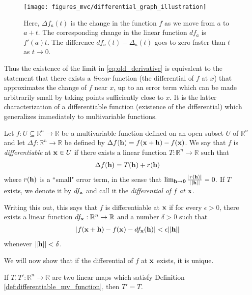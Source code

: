 \documentclass[12pt,letterpaper,reqno]{article}
\numberwithin{equation}{section}
\newcommand{\bh}{{\bf h}}
\newcommand{\R}{\ensuremath{\mathbb R}}
\newcommand{\zv}{{\bf 0}}
\newcommand{\bx}{{\bf x}}
\begin{document}
{\begin{figure}[h]
	\centering
	\texttt{[image: figures\_mvc/differential\_graph\_illustration]}
	\caption{Here, $\Delta f_a(t)$ is the change in the function $f$ as we move from $a$ to $a+t$. The corresponding change in the linear function $df_a$ is $f'(a)t$. The difference $df_a(t)-\Delta_a(t)$ goes to zero faster than $t$ as $t \to 0$.}
\end{figure}

Thus the existence of the limit in \eqref{eq:old_derivative} is equivalent to the statement that there exists a \emph{linear} function (the differential of $f$ at $x$) that approximates the change of $f$ near $x$, up to an error term which can be made arbitrarily small by taking points sufficiently close to $x$. It is the latter characterization of a differentiable function (existence of the differential) which generalizes immediately to multivariable functions.

\begin{defn}\label{def:differentiable_mv_function}
Let $f:U \subseteq \R^n \to \R$ be a multivariable function defined on an open subset $U$ of $\R^n$ and let $\Delta f:\R^n \to \R$ be defined by $\Delta f(\bh)=f(\bx + \bh)-f(\bx)$. We say that $f$ is \emph{differentiable} at $\bx \in U$ if there exists a linear function $T:\R^n \to \R$ such that  
\begin{align*}
	\Delta f(\bh)=T(\bh)+r(\bh)
\end{align*}	
where $r(\bh)$ is a ``small" error term, in the sense that $\lim_{\bh \to \zv}\frac{|r(\bh)|}{||\bh||}=0$. If $T$ exists, we denote it by $df_\bx$ and call it the \emph{differential of $f$ at $\bx$}. 

Writing this out, this says that $f$ is differentiable at $\bx$ if for every $\epsilon>0$, there exists a linear function $df_\bx:\R^n \to \R$ and a number $\delta>0$ such that 
\begin{align*}
	|f(\bx+\bh)-f(\bx)-df_\bx(\bh)|<\epsilon ||\bh||
\end{align*}
whenever $||\bh||<\delta$.
\end{defn}
We will now show that if the differential of $f$ at $\bx$ exists, it is unique.

\begin{prop}\label{prop:uniqueness_of_the_differential}
	If $T,T':\R^n \to \R$ are two linear maps which satisfy Definition \ref{def:differentiable_mv_function}, then $T'=T$.
\end{prop}

}
\end{document}
